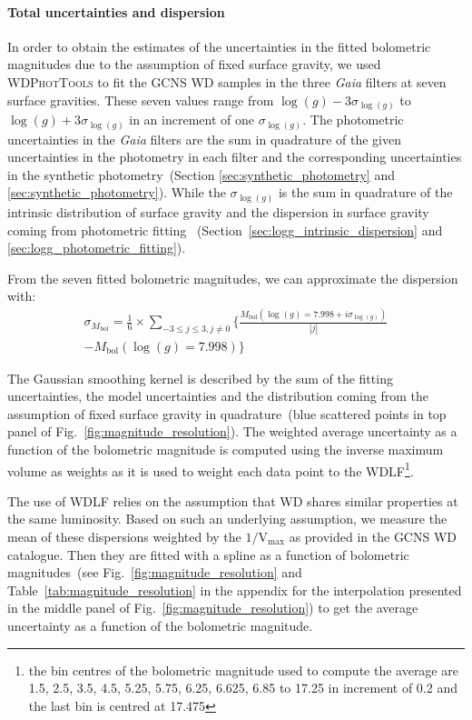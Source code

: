 \documentclass[fleqn,usenatbib]{mnras}
\begin{document}
\paragraph*{Total uncertainties and dispersion \hfill\\}
In order to obtain the estimates of the uncertainties in the fitted bolometric
magnitudes due to the assumption of fixed surface gravity, we used
\textsc{WDPhotTools} to fit the GCNS WD samples in the three \textit{Gaia} filters at
seven surface gravities. These seven values range from
$\log(g) - 3\sigma_{\log(g)}$ to $\log(g) + 3\sigma_{\log(g)}$
in an increment of one $\sigma_{\log(g)}$. The photometric
uncertainties in the \textit{Gaia} filters are the sum in quadrature of the given
uncertainties in the photometry in each filter and the corresponding
uncertainties in the synthetic photometry~(Section \ref{sec:synthetic_photometry} and
\ref{sec:synthetic_photometry}). While the $\sigma_{\log(g)}$ is the
sum in quadrature of the intrinsic distribution of surface gravity and the
dispersion in surface gravity coming from photometric fitting~
(Section~\ref{sec:logg_intrinsic_dispersion} and \ref{sec:logg_photometric_fitting}).

From the seven fitted
bolometric magnitudes, we can approximate the dispersion with:
\begin{multline}
  \sigma_{M_{\mathrm{bol}}} = \frac{1}{6} \times \sum_{-3 \leq j \leq 3, j \neq 0} \Biggl\{ \frac{M_{\mathrm{bol}}(\log(g)=7.998 + i\sigma_{\log(g)})}{|j|} \\
  - M_{\mathrm{bol}}(\log(g)=7.998) \Biggr\}
\end{multline}


The Gaussian smoothing kernel is described by the sum of the fitting
uncertainties, the model uncertainties and the distribution coming from the
assumption of fixed surface gravity in quadrature~(blue scattered points in top
panel of Fig.~\ref{fig:magnitude_resolution}). The weighted average uncertainty
as a function of the bolometric magnitude is computed using the inverse maximum
volume as weights as it is used to weight each data point to the WDLF\footnote{
the bin centres of the bolometric magnitude used to compute the average are
1.5,  2.5,  3.5,  4.5,  5.25,  5.75,  6.25,  6.625, 6.85 to 17.25 in increment
of 0.2 and the last bin is centred at 17.475}.

The use of WDLF relies on the assumption that WD shares similar properties
at the same luminosity. Based on such an underlying assumption, we measure
the mean of these dispersions weighted by the $1/\mathrm{V}_{\mathrm{max}}$
as provided in the GCNS WD catalogue. Then they are fitted with a spline as
a function of bolometric magnitudes~(see Fig.~\ref{fig:magnitude_resolution}
and Table~\ref{tab:magnitude_resolution} in the appendix for the interpolation
presented in the middle panel of Fig.~\ref{fig:magnitude_resolution}) to get
the average uncertainty as a function of the bolometric magnitude.
\end{document}
